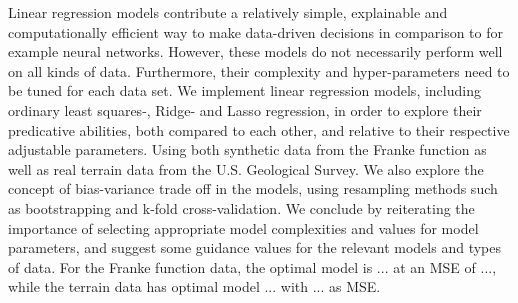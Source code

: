 Linear regression models contribute a relatively simple, explainable and computationally efficient way to make data-driven decisions in comparison to for example neural networks.
However, these models do not necessarily perform well on all kinds of data.
Furthermore, their complexity and hyper-parameters need to be tuned for each data set.
We implement linear regression models, including ordinary least squares-, Ridge- and Lasso regression, in order to explore their predicative abilities, both compared to each other, and relative to their respective adjustable parameters. 
Using both synthetic data from the Franke function \citep[p. 13]{frank} as well as real terrain data from the U.S. Geological Survey. 
We also explore the concept of bias-variance trade off in the models, using resampling methods such as bootstrapping and k-fold cross-validation. 
We conclude by reiterating the importance of selecting appropriate model complexities and values for model parameters, and suggest some guidance values for the relevant models and types of data. 
For the Franke function data, the optimal model is ... at an MSE of ..., while the terrain data has optimal model ... with ... as MSE. 
